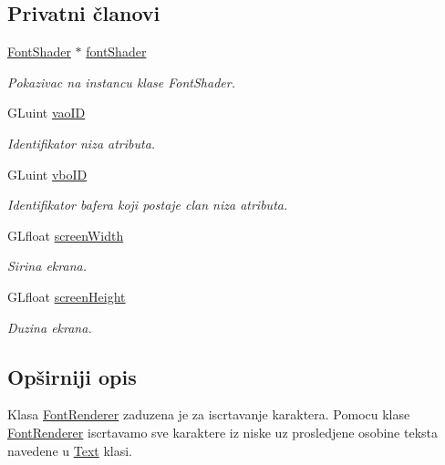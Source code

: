 \subsection*{Privatni članovi}
\begin{DoxyCompactItemize}
\item 
\hyperlink{classshader_1_1FontShader}{Font\+Shader} $\ast$ \hyperlink{classfont_1_1FontRenderer_ac53abacecd3c69c963e481ba7af5041b}{font\+Shader}
\begin{DoxyCompactList}\small\item\em Pokazivac na instancu klase Font\+Shader. \end{DoxyCompactList}\item 
G\+Luint \hyperlink{classfont_1_1FontRenderer_aa67dc4a985fd53d19094b542601f20f6}{vao\+ID}
\begin{DoxyCompactList}\small\item\em Identifikator niza atributa. \end{DoxyCompactList}\item 
G\+Luint \hyperlink{classfont_1_1FontRenderer_aea11a2460411cec768c047adc0e2615d}{vbo\+ID}
\begin{DoxyCompactList}\small\item\em Identifikator bafera koji postaje clan niza atributa. \end{DoxyCompactList}\item 
G\+Lfloat \hyperlink{classfont_1_1FontRenderer_aa86ddacb12c06709125f0b72d275d7ba}{screen\+Width}
\begin{DoxyCompactList}\small\item\em Sirina ekrana. \end{DoxyCompactList}\item 
G\+Lfloat \hyperlink{classfont_1_1FontRenderer_ad048dc05d9a1f47944f1c2a913840fa3}{screen\+Height}
\begin{DoxyCompactList}\small\item\em Duzina ekrana. \end{DoxyCompactList}\end{DoxyCompactItemize}


\subsection{Opširniji opis}
Klasa \hyperlink{classfont_1_1FontRenderer}{Font\+Renderer} zaduzena je za iscrtavanje karaktera. Pomocu klase \hyperlink{classfont_1_1FontRenderer}{Font\+Renderer} iscrtavamo sve karaktere iz niske uz prosledjene osobine teksta navedene u \hyperlink{classfont_1_1Text}{Text} klasi. 

